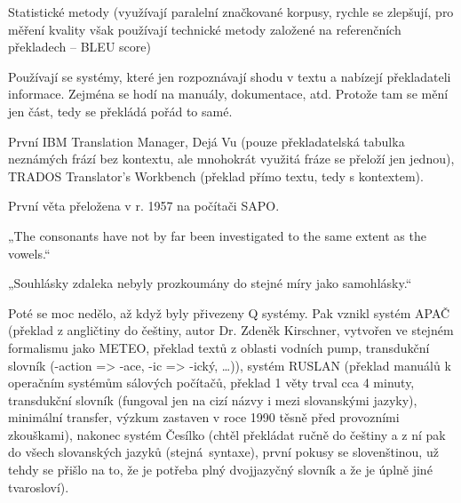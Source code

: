 \documentclass[12pt]{article}					%
\begin{document}
\begin{poznamka}
	Statistické metody (využívají paralelní značkované korpusy, rychle se zlepšují, pro měření kvality však používají technické metody založené na referenčních překladech – BLEU score)
\end{poznamka}


\begin{definice}
	Používají se systémy, které jen rozpoznávají shodu v textu a nabízejí překladateli informace. Zejména se hodí na manuály, dokumentace, atd. Protože tam se mění jen část, tedy se překládá pořád to samé.

	První IBM Translation Manager, Dejá Vu (pouze překladatelská tabulka neznámých frází bez kontextu, ale mnohokrát využitá fráze se přeloží jen jednou), TRADOS Translator's Workbench (překlad přímo textu, tedy s kontextem).
\end{definice}

\begin{definice}
	První věta přeložena v r. 1957 na počítači SAPO.

	„The consonants have not by far been investigated to the same extent as the vowels.“

	„Souhlásky zdaleka nebyly prozkoumány do stejné míry jako samohlásky.“

	Poté se moc nedělo, až když byly přivezeny Q systémy. Pak vznikl systém APAČ (překlad z angličtiny do češtiny, autor Dr. Zdeněk Kirschner, vytvořen ve stejném formalismu jako METEO, překlad textů z oblasti vodních pump, transdukční slovník (-action => -ace, -ic => -ický, …)), systém RUSLAN (překlad manuálů k operačním systémům sálových počítačů, překlad 1 věty trval cca 4 minuty, transdukční slovník (fungoval jen na cizí názvy i mezi slovanskými jazyky), minimální transfer, výzkum zastaven v roce 1990 těsně před provozními zkouškami), nakonec systém Česílko (chtěl překládat ručně do češtiny a z ní pak do všech slovanských jazyků (stejná syntaxe), první pokusy se slovenštinou, už tehdy se přišlo na to, že je potřeba plný dvojjazyčný slovník a že je úplně jiné tvarosloví).
\end{definice}
\end{document}
